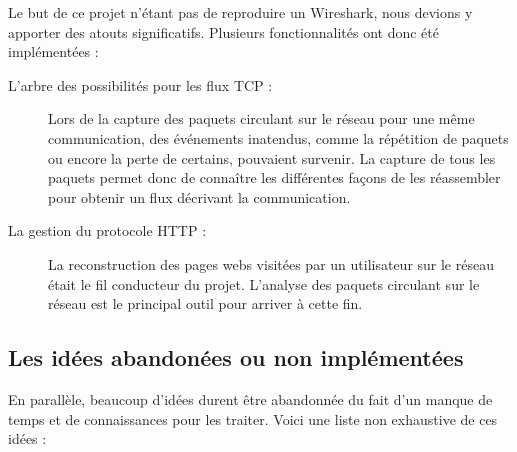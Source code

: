 Le but de ce projet n'étant pas de reproduire un Wireshark, nous devions y apporter des atouts significatifs. Plusieurs fonctionnalités ont donc été implémentées :

\begin{description}
\item[L'arbre des possibilités pour les flux TCP :] Lors de la capture des paquets circulant sur le réseau pour une même communication, des événements inatendus, comme la répétition de paquets ou encore la perte de certains,  pouvaient survenir. La capture de tous les paquets permet donc de connaître les différentes façons de les réassembler pour obtenir un flux décrivant la communication. 
\item[La gestion du protocole HTTP :] La reconstruction des pages webs visitées par un utilisateur sur le réseau était le fil conducteur du projet. L'analyse des paquets circulant sur le réseau est le principal outil pour arriver à cette fin.\\
\end{description}

\subsection{Les idées abandonées ou non implémentées}
En parallèle, beaucoup d'idées durent être abandonnée du fait d'un manque de temps et de connaissances pour les traiter. Voici une liste non exhaustive de ces idées :
